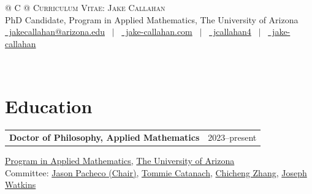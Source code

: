 \documentclass[a4paper,12pt]{article}
\begin{document}
\pagestyle{empty} 


\begin{tabularx}{\linewidth}{@{} C @{}}
\Large{\scshape Curriculum Vitae: Jake Callahan}\\[7.5pt]
PhD Candidate, Program in Applied Mathematics, The University of Arizona\\[7.5pt]
\href{mailto:jakecallahan@arizona.edu}{\raisebox{-0.05\height}\faEnvelope \ jakecallahan@arizona.edu} \ $|$ \
\href{https://jake-callahan.com}{\raisebox{-0.05\height}\faGlobe \ jake-callahan.com} \ $|$ \ 
\href{https://github.com/jcallahan4}{\raisebox{-0.05\height}\faGithub\ jcallahan4} \ $|$ \ 
\href{https://linkedin.com/in/jake-callahan}{\raisebox{-0.05\height}\faLinkedin\ jake-callahan} 
\end{tabularx}
\\[10pt]

\section{Education}
\begin{tabularx}{\linewidth}{@{}X r@{}}
\textbf{Doctor of Philosophy, Applied Mathematics} & 2023--present \\
\end{tabularx}
\href{https://appliedmath.arizona.edu}{Program in Applied Mathematics,} \href{https://arizona.edu}{The University of Arizona} \\
Committee: \href{https://scholar.google.com/citations?user=71ZEsnEAAAAJ&hl=en}{Jason Pacheco (Chair)}, 
\href{https://scholar.google.com/citations?user=HfMJR_AAAAAJ&hl=en}{Tommie Catanach},
\href{https://scholar.google.com/citations?user=29B3BAgAAAAJ&hl=en}{Chicheng Zhang},
\href{https://scholar.google.com/citations?user=tTej1tUAAAAJ&hl=en}{Joseph Watkins}
\end{document}
